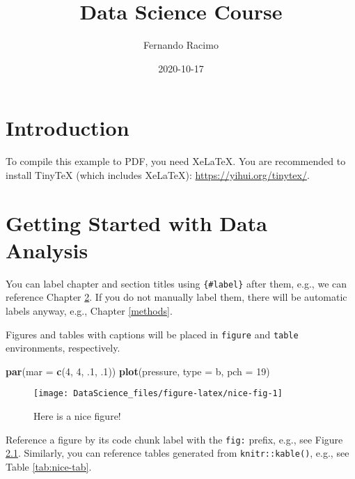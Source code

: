 \documentclass[
]{book}
\title{Data Science Course}
\author{Fernando Racimo}
\date{2020-10-17}
\newenvironment{Shaded}{\begin{snugshade}}{\end{snugshade}}
\newcommand{\DataTypeTok}[1]{\textcolor[rgb]{0.13,0.29,0.53}{#1}}
\newcommand{\DecValTok}[1]{\textcolor[rgb]{0.00,0.00,0.81}{#1}}
\newcommand{\FloatTok}[1]{\textcolor[rgb]{0.00,0.00,0.81}{#1}}
\newcommand{\KeywordTok}[1]{\textcolor[rgb]{0.13,0.29,0.53}{\textbf{#1}}}
\newcommand{\NormalTok}[1]{#1}
\newcommand{\StringTok}[1]{\textcolor[rgb]{0.31,0.60,0.02}{#1}}
\begin{document}
\maketitle

{
\setcounter{tocdepth}{1}
\tableofcontents
}
\hypertarget{introduction}{%
\chapter{Introduction}\label{introduction}}

To compile this example to PDF, you need XeLaTeX. You are recommended to install TinyTeX (which includes XeLaTeX): \url{https://yihui.org/tinytex/}.

\hypertarget{intro}{%
\chapter{Getting Started with Data Analysis}\label{intro}}

You can label chapter and section titles using \texttt{\{\#label\}} after them, e.g., we can reference Chapter \ref{intro}. If you do not manually label them, there will be automatic labels anyway, e.g., Chapter \ref{methods}.

Figures and tables with captions will be placed in \texttt{figure} and \texttt{table} environments, respectively.

\begin{Shaded}
\begin{Highlighting}[]
\KeywordTok{par}\NormalTok{(}\DataTypeTok{mar =} \KeywordTok{c}\NormalTok{(}\DecValTok{4}\NormalTok{, }\DecValTok{4}\NormalTok{, }\FloatTok{.1}\NormalTok{, }\FloatTok{.1}\NormalTok{))}
\KeywordTok{plot}\NormalTok{(pressure, }\DataTypeTok{type =} \StringTok{\textquotesingle{}b\textquotesingle{}}\NormalTok{, }\DataTypeTok{pch =} \DecValTok{19}\NormalTok{)}
\end{Highlighting}
\end{Shaded}

\begin{figure}

{\centering \texttt{[image: DataScience\_files/figure-latex/nice-fig-1]} 

}

\caption{Here is a nice figure!}\label{fig:nice-fig}
\end{figure}

Reference a figure by its code chunk label with the \texttt{fig:} prefix, e.g., see Figure \ref{fig:nice-fig}. Similarly, you can reference tables generated from \texttt{knitr::kable()}, e.g., see Table \ref{tab:nice-tab}.
\end{document}
